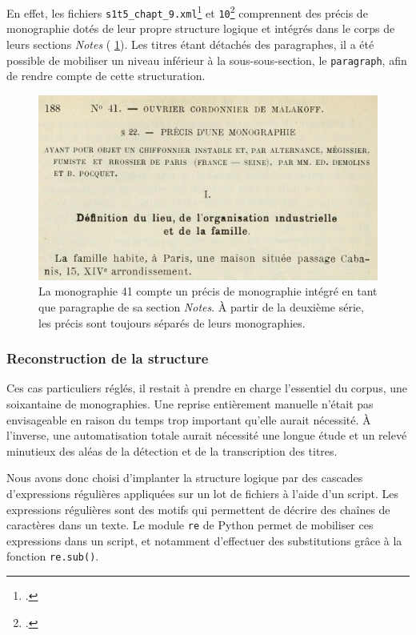 En effet, les fichiers \texttt{s1t5\_chapt\_9.xml}\footcite{mono041a} et \texttt{10}\footcite{mono042a} comprennent des précis de monographie dotés de leur propre structure logique et intégrés dans le corps de leurs sections \textit{Notes} (\fig{} \ref{fig:precis41}). Les titres étant détachés des paragraphes, il a été possible de mobiliser un niveau inférieur à la sous-sous-section, le \texttt{paragraph}, afin de rendre compte de cette structuration.

\begin{figure}
    \centering
    \includegraphics[width=14cm]{img/precis_mono_41_p_188.jpg}
    \caption[Précis de monographie dans la monographie \no{}41.]{La monographie \no{}41 compte un précis de monographie intégré en tant que paragraphe de sa section \textit{Notes}. À partir de la deuxième série, les précis sont toujours séparés de leurs monographies.}
    \label{fig:precis41}
\end{figure}

\subsubsection{Reconstruction de la structure}

Ces cas particuliers réglés, il restait à prendre en charge l'essentiel du corpus, \cad{} une soixantaine de monographies. Une reprise entièrement manuelle n'était pas envisageable en raison du temps trop important qu'elle aurait nécessité. À l'inverse, une automatisation totale aurait nécessité une longue étude et un relevé minutieux des aléas de la détection et de la transcription des titres.

Nous avons donc choisi d'implanter la structure logique par des cascades d'expressions régulières appliquées sur un lot de fichiers à l'aide d'un script. Les expressions régulières sont des motifs qui permettent de décrire des chaînes de caractères dans un texte. Le module \texttt{re} de Python permet de mobiliser ces expressions dans un script, et notamment d'effectuer des substitutions grâce à la fonction \texttt{re.sub()}.

